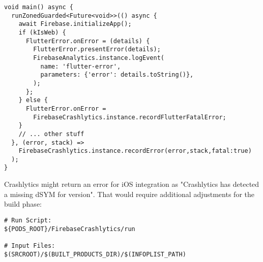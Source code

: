 \begin{lstlisting}
void main() async {
  runZonedGuarded<Future<void>>(() async {
    await Firebase.initializeApp();
    if (kIsWeb) {
      FlutterError.onError = (details) {
        FlutterError.presentError(details);
        FirebaseAnalytics.instance.logEvent(
          name: 'flutter-error', 
          parameters: {'error': details.toString()},
        );
      };
    } else {
      FlutterError.onError =
        FirebaseCrashlytics.instance.recordFlutterFatalError;
    }
    // ... other stuff
  }, (error, stack) =>
    FirebaseCrashlytics.instance.recordError(error,stack,fatal:true)
  );
}
\end{lstlisting}

\noindent Crashlytics might return an error for iOS integration as "Crashlytics has detected a missing dSYM for version".
That would require additional adjustments for the  build phase:

\begin{lstlisting}[language=terminal]
# Run Script: 
${PODS_ROOT}/FirebaseCrashlytics/run

# Input Files: 
$(SRCROOT)/$(BUILT_PRODUCTS_DIR)/$(INFOPLIST_PATH)
\end{lstlisting}
